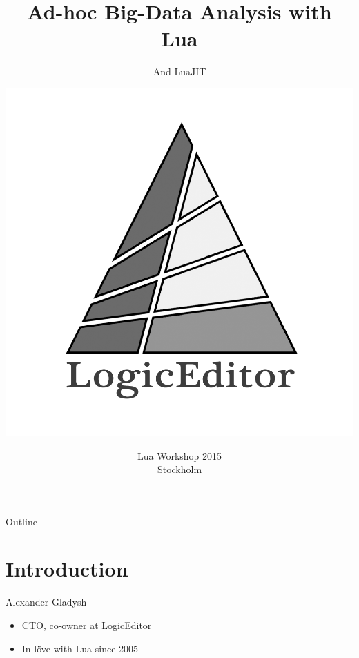 \documentclass[handout]{beamer}
\title{Ad-hoc Big-Data Analysis with Lua}
\subtitle{And LuaJIT}
\author{\includegraphics[height=.4\textheight]{logo}}
\institute{Alexander Gladysh <ag@logiceditor.com>\newline@agladysh}
\date{Lua Workshop 2015\\Stockholm}
\begin{document}
\maketitle


\begin{frame}{Outline}

\tableofcontents

\end{frame}


\section{Introduction}


\begin{frame}{Alexander Gladysh}

\begin{itemize}
\item CTO, co-owner at LogicEditor
\item In löve with Lua since 2005
\end{itemize}

\end{frame}
\end{document}
